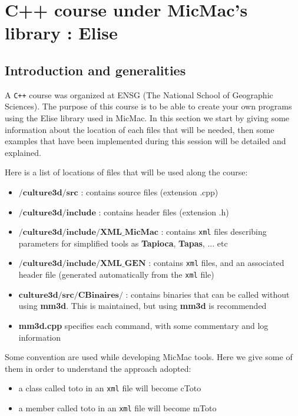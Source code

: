 \documentclass[a4paper]{book}
\begin{document}

\section{C++ course under MicMac's library : Elise}
\subsection{Introduction and generalities}
A \verb!C++! course was organized at ENSG (The National School of Geographic Sciences). The purpose of this course is to be able to create your own programs using the Elise library used in MicMac. In this section we start by giving some information about the location of each files that will be needed, then some examples that have been implemented during this session will be detailed and explained.\newline

Here is a list of locations of files that will be used along the course:\newline
\begin{itemize}
\item $\textbf{/culture3d/src}$ : contains source files (extension .cpp) \newline
\item $\textbf{/culture3d/include}$ : contains header files (extension .h)\newline
\item $\textbf{/culture3d/include/XML\_MicMac}$ : contains \verb!xml! files describing parameters for simplified tools as \textbf{Tapioca}, \textbf{Tapas}, ... etc\newline
\item $\textbf{/culture3d/include/XML\_GEN}$ : contains \verb!xml! files, and an associated header file (generated automatically from the \verb!xml! file)\newline
\item $\textbf{culture3d/src/CBinaires/}$ : contains binaries that can be called without using \textbf{mm3d}. This is maintained, but using \textbf{mm3d} is recommended\newline
\item \textbf{mm3d.cpp} specifies each command, with some commentary and log information\newline
\end{itemize}

Some convention are used while developing MicMac tools. Here we give some of them in order to understand the approach adopted: \newline
\begin{itemize}
\item a class called toto in an \verb!xml! file will become cToto \newline
\item a member called toto in an \verb!xml! file will become mToto \newline
\end{itemize}
\end{document}
